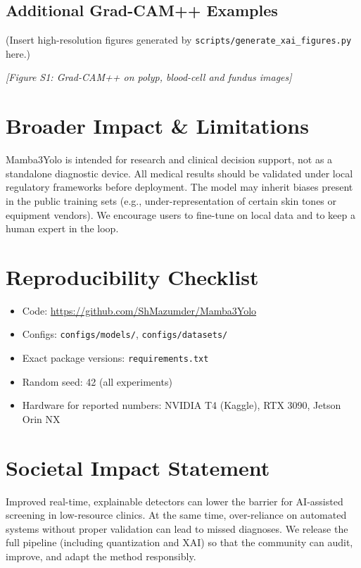 \documentclass[11pt]{article}
\begin{document}
\subsection{Additional Grad-CAM++ Examples}
(Insert high-resolution figures generated by \texttt{scripts/generate\_xai\_figures.py} here.)

\begin{center}
\textit{[Figure S1: Grad-CAM++ on polyp, blood-cell and fundus images]}
\end{center}

\section{Broader Impact \& Limitations}
Mamba3Yolo is intended for research and clinical decision support, not as a standalone diagnostic device. All medical results should be validated under local regulatory frameworks before deployment. The model may inherit biases present in the public training sets (e.g., under-representation of certain skin tones or equipment vendors). We encourage users to fine-tune on local data and to keep a human expert in the loop.

\section{Reproducibility Checklist}
\begin{itemize}[leftmargin=*]
  \item Code: \url{https://github.com/ShMazumder/Mamba3Yolo}
  \item Configs: \texttt{configs/models/}, \texttt{configs/datasets/}
  \item Exact package versions: \texttt{requirements.txt}
  \item Random seed: 42 (all experiments)
  \item Hardware for reported numbers: NVIDIA T4 (Kaggle), RTX 3090, Jetson Orin NX
\end{itemize}

\section{Societal Impact Statement}
Improved real-time, explainable detectors can lower the barrier for AI-assisted screening in low-resource clinics. At the same time, over-reliance on automated systems without proper validation can lead to missed diagnoses. We release the full pipeline (including quantization and XAI) so that the community can audit, improve, and adapt the method responsibly.
\end{document}
